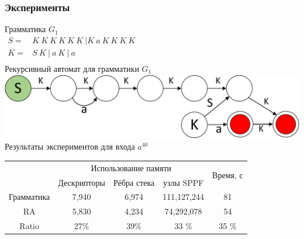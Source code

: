 \documentclass{beamer}
\begin{document}
	\begin{frame} 
		\frametitle{Эксперименты}
		\begin{center}
		\vspace{-10pt}
		Грамматика $G_1$\\
		\vspace{6pt}
		$
		\begin{array}{rl}
		S =& K\ K\ K\ K\ K\ K \ | K\ a\ K\ K\ K\ K \\
		K =& S\ K\ |\ a\ K\ |\ a \\
		\end{array}
		$
		\\
		\vspace{10pt}
		Рекурсивный автомат для грамматики $G_1$
		\\
		\vspace{6pt}
		\includegraphics[scale=.5]{pictures/G1automaton.pdf}
		\\
		\vspace{7pt}
		Результаты экспериментов для входа $a^{40}$
		\\
		\vspace{2pt}
		\begin{tabular}{ | c | c | c | c | c | }
			\hline
			\multirow{2}{*}[-1ex]{} &\multicolumn{3}{c|}{Использование памяти} & \multirow{2}{*}[-1ex]{Время, с} \\
			\cline{2-4}
             &  Дескрипторы & Рёбра стека & узлы SPPF &    \\ \hline
			Грамматика &  7,940        & 6,974      & 111,127,244 & 81 \\ \hline
		     RA &  5,830        & 4,234      & 74,292,078  & 54 \\ \hline \hline
			Ratio   &  27$\%$       & 39$\%$     & 33 $\%$ & 35 $\%$    \\ \hline
		\end{tabular}
		\end{center}
	\end{frame}
	
\end{document}
